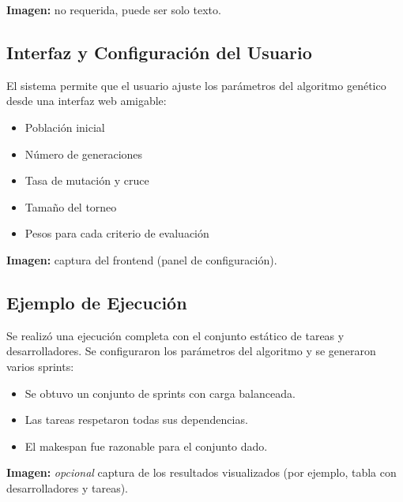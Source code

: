 \noindent\textbf{Imagen:} no requerida, puede ser solo texto.

\subsection{Interfaz y Configuración del Usuario}

El sistema permite que el usuario ajuste los parámetros del algoritmo genético desde una interfaz web amigable:

\begin{itemize}
    \item Población inicial
    \item Número de generaciones
    \item Tasa de mutación y cruce
    \item Tamaño del torneo
    \item Pesos para cada criterio de evaluación
\end{itemize}

\noindent\textbf{Imagen:} captura del frontend (panel de configuración).

\subsection{Ejemplo de Ejecución}

Se realizó una ejecución completa con el conjunto estático de tareas y desarrolladores. Se configuraron los parámetros del algoritmo y se generaron varios sprints:

\begin{itemize}
    \item Se obtuvo un conjunto de sprints con carga balanceada.
    \item Las tareas respetaron todas sus dependencias.
    \item El makespan fue razonable para el conjunto dado.
\end{itemize}

\noindent\textbf{Imagen:} \textit{opcional} captura de los resultados visualizados (por ejemplo, tabla con desarrolladores y tareas).




